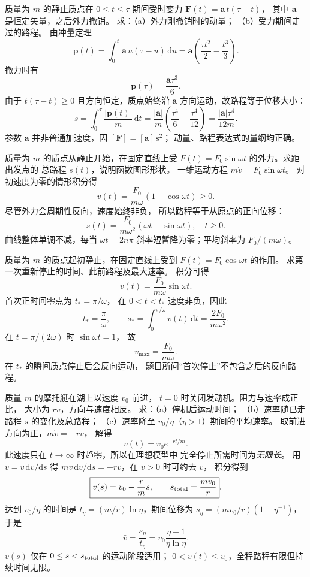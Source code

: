 质量为 $m$ 的静止质点在 $0\le t\le\tau$ 期间受时变力
$\bm F(t)=\bm a\,t(\tau-t)$，
其中 $\bm a$ 是恒定矢量，之后外力撤销。
求：（a）外力刚撤销时的动量；
（b）受力期间走过的路程。
\exsolution
由冲量定理
\[
\bm p(t)=\int_0^t\bm a\,u(\tau-u)\,\mathrm du
=\bm a\left(\frac{\tau t^2}{2}-\frac{t^3}{3}\right).
\]
撤力时有
\[
\boxed{\bm p(\tau)=\frac{\bm a\tau^3}{6}}.
\]
由于 $t(\tau-t)\ge0$ 且方向恒定，质点始终沿 $\bm a$
方向运动，故路程等于位移大小：
\[
s=\int_0^\tau\frac{|\bm p(t)|}{m}\,\mathrm dt
=\frac{|\bm a|}{m}\left(\frac{\tau^4}{6}
-\frac{\tau^4}{12}\right)
=\boxed{\frac{|\bm a|\tau^4}{12m}}.
\]
\excheck 参数 $\bm a$ 并非普通加速度，因
$[\bm F]=[\bm a]\,\mathrm s^2$；
动量、路程表达式的量纲均正确。

质量为 $m$ 的质点从静止开始，在固定直线上受
$F(t)=F_0\sin\omega t$ 的外力。求距出发点的
总路程 $s(t)$，说明函数图形形状。
\exsolution
一维运动方程 $m\dot v=F_0\sin\omega t$。
对初速度为零的情形积分得
\[
v(t)=\frac{F_0}{m\omega}(1-\cos\omega t)\ge0.
\]
尽管外力会周期性反向，速度始终非负，
所以路程等于从原点的正向位移：
\[
\boxed{s(t)=\frac{F_0}{m\omega^2}
(\omega t-\sin\omega t)},\quad t\ge0.
\]
\excheck 曲线整体单调不减，每当 $\omega t=2n\pi$
斜率短暂降为零；平均斜率为 $F_0/(m\omega)$。

质量为 $m$ 的质点起初静止，在固定直线上受到
$F(t)=F_0\cos\omega t$ 的作用。
求第一次重新停止的时间、此前路程及最大速率。
\exsolution
积分可得
\[
v(t)=\frac{F_0}{m\omega}\sin\omega t.
\]
首次正时间零点为 $t_*=\pi/\omega$，
在 $0<t<t_*$ 速度非负，因此
\[
\boxed{t_*=\frac\pi\omega,\qquad
s_*=\int_0^{\pi/\omega}v(t)\,\mathrm dt
=\frac{2F_0}{m\omega^2}}.
\]
在 $t=\pi/(2\omega)$ 时 $\sin\omega t=1$，
故
\[
\boxed{v_{\max}=\frac{F_0}{m\omega}}.
\]
\excheck 在 $t_*$ 的瞬间质点停止后会反向运动，
题目所问“首次停止”不包含之后的反向路程。

质量 $m$ 的摩托艇在湖上以速度 $v_0$ 前进，
$t=0$ 时关闭发动机。阻力与速率成正比，
大小为 $rv$，方向与速度相反。
求：（a）停机后运动时间；
（b）速率随已走路程 $s$ 的变化及总路程；
（c）速率降至 $v_0/\eta$（$\eta>1$）期间的平均速率。
\exsolution
取前进方向为正，$m\dot v=-rv$，
解得
\[
\boxed{v(t)=v_0e^{-rt/m}}.
\]
此速度只在 $t\to\infty$ 时趋零，所以在理想模型中
完全停止所需时间为\emph{无限长}。
用 $\dot v=v\,\mathrm dv/\mathrm ds$ 得
$m v\,\mathrm dv/\mathrm ds=-rv$，在 $v>0$ 时可约去 $v$，
积分得到
\[
\boxed{v(s)=v_0-\frac rm s,\qquad
s_{\rm total}=\frac{mv_0}{r}}.
\]
达到 $v_0/\eta$ 的时间是
$t_\eta=(m/r)\ln\eta$，期间位移为
$s_\eta=(mv_0/r)(1-\eta^{-1})$，于是
\[
\boxed{\bar v=\frac{s_\eta}{t_\eta}
=v_0\frac{\eta-1}{\eta\ln\eta}}.
\]
\excheck $v(s)$ 仅在 $0\le s<s_{\rm total}$ 的运动阶段适用；
$0<v(t)\le v_0$，全程路程有限但持续时间无限。

